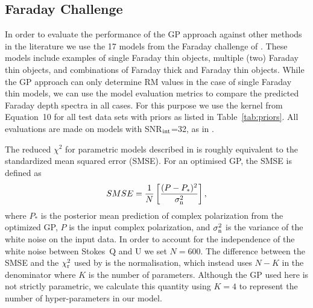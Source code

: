 \documentclass[fleqn,usenatbib]{mnras}
\begin{document}
\subsection{Faraday Challenge}
\label{sec:challenges}

%

%
In order to evaluate the performance of the GP approach against other methods in the literature we use the 17 models from the Faraday challenge of \cite{Sun_2015}. These models include examples of single Faraday thin objects, multiple (two) Faraday thin objects, and combinations of  Faraday thick and Faraday thin objects. While the GP approach can only determine RM values in the case of single Faraday thin models, we can use the model evaluation metrics to compare the predicted Faraday depth spectra in all cases. For this purpose we use the kernel from Equation~10 for all test data sets with priors as listed in Table~\ref{tab:priors}. All evaluations are made on models with SNR$_{\rm int}$=32, as in \cite{Sun_2015}.

The reduced $\chi^2$ for parametric models described in \cite{Sun_2015} is roughly equivalent to the standardized mean squared error (SMSE). For an optimised GP, the SMSE is defined as
%
\begin{equation}
SMSE = \frac{1}{N}\left[ \frac{(P - P_{\ast})^2}{\sigma_{\rm n}^2}  \right],
\end{equation}
%
where $P_{\ast}$ is the posterior mean prediction of complex polarization from the optimized GP, $P$ is the input complex polarization, and $\sigma_{\rm n}^2$ is the variance of the white noise on the input data. In order to account for the independence of the white noise between Stokes~Q and U we set $N=600$. The difference between the SMSE and the $\chi^2_{\rm r}$ used by \cite{Sun_2015} is the normalisation, which instead uses $N-K$ in the denominator where $K$ is the number of parameters. Although the GP used here is not strictly parametric, we calculate this quantity using $K=4$ to represent the number of hyper-parameters in our model.
\end{document}
